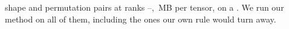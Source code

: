 %
\begin{table}[!t]
\centering
\caption{
\methTabCases{} shape and permutation pairs at ranks \resRankLo{}--\resRankHi{},
\resTensorMB{}\,MB per tensor, on a \resDevice{}. We run our method on all of
them, including the ones our own rule would turn away.}
\label{tab:methods}
\small
\begin{minipage}{0.72\linewidth}
\centering
%
\end{minipage}
\end{table}
